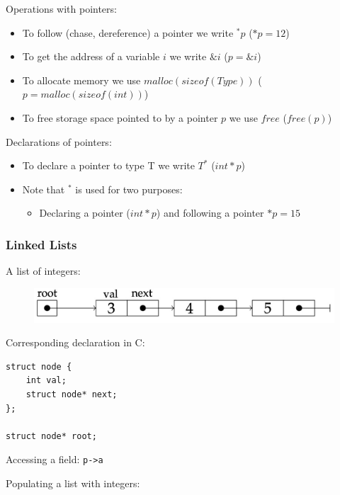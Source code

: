 Operations with pointers:
\begin{itemize}
    \item To follow (chase, dereference) a pointer we write $^*p$ \quad ($ *p = 12$)
    \item To get the address of a variable $i$ we write $\&i$ \quad ($p=\&i$)
    \item To allocate memory we use $malloc(sizeof(Type))$ \quad ($p  = malloc(sizeof(int))$)
    \item To free storage space pointed to by a pointer $p$ we use $free$ \quad ($free(p)$)
\end{itemize}

Declarations of pointers:
\begin{itemize}
    \item To declare a pointer to type T we write $T^*$ \quad ($int* p$)
    \item Note that $^*$ is used for two purposes: 
    \begin{itemize}
        \item Declaring a pointer ($int* p$) and following a pointer $*p=15$
    \end{itemize}
\end{itemize}


\subsubsection{Linked Lists}
\begin{itemize}
    \item A list of integers:
    \begin{figure}[H]
        \centering
        \includegraphics[width=0.5\linewidth]{images/Screenshot 2024-05-30 at 19.03.47.jpg}
    \end{figure}
    \begin{minipage}{0.5\textwidth}
    \item Corresponding declaration in C:
    \begin{lstlisting}
struct node {
    int val;
    struct node* next;
};

struct node* root;
\end{lstlisting}
\end{minipage}
\item Accessing a field: \texttt{p->a}
\end{itemize}
Populating a list with integers:\\

